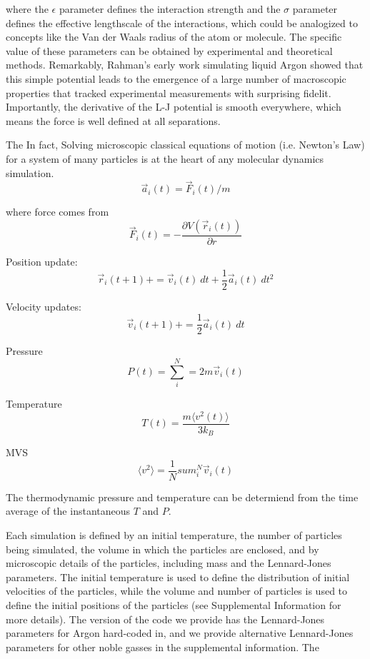\documentclass[journal=jpclcd,manuscript=article]{achemso}
\begin{document}
where the $\epsilon$ parameter defines the interaction strength and the $\sigma$ parameter defines the effective
lengthscale of the interactions, which could be analogized to concepts like the Van der Waals radius of the atom or molecule.
The specific value of these parameters can be obtained by experimental and theoretical methods.  Remarkably, Rahman's early
work simulating liquid Argon showed that this simple potential leads to the emergence of a large number of macroscopic properties 
that tracked experimental measurements with surprising fidelit. %
Importantly, the derivative of the L-J potential is smooth everywhere, which means the force is well defined
at all separations.  

The 
In fact, 
Solving microscopic classical equations of motion (i.e. Newton's Law) 
for a system of many particles is at the heart of 
any molecular dynamics simulation.   
\begin{equation}
\vec{a}_i(t) = \vec{F}_i(t) / m
\end{equation}

where force comes from
\begin{equation}
\vec{F}_i(t) = -\frac{ \partial V( \vec{r}_i(t) ) }{ \partial r}
\end{equation}

Position update:
\begin{equation}
\vec{r}_{i}(t+1) += \vec{v}_i(t) \: dt + \frac{1}{2} \vec{a}_i(t) \: dt^2 
\end{equation}

Velocity updates:
\begin{equation}
\vec{v}_i (t+1) += \frac{1}{2} \vec{a}_i(t) \: dt
\end{equation}

Pressure
\begin{equation}
P(t) = \sum_i^N = 2 m \vec{v}_i(t)
\end{equation}

Temperature
\begin{equation}
T(t) = \frac{ m \langle v^2 (t) \rangle }{3 k_B}
\end{equation}

MVS
\begin{equation}
\langle v^2 \rangle = \frac{1}{N} sum_i^N \vec{v}_i(t)
\end{equation}

The thermodynamic pressure and temperature can be determiend from the time average of
the instantaneous $T$ and $P$.  

Each simulation is defined
by an initial temperature, the number of particles being simulated, the volume in which the particles are enclosed,
and by microscopic details of the particles, including mass and the Lennard-Jones parameters.  The initial temperature
is used to define the distribution of initial velocities of the particles, while the volume and number of particles is used
to define the initial positions of the particles (see Supplemental Information for more details).  The version of the code
we provide has the Lennard-Jones parameters for Argon%
hard-coded in, and we provide alternative Lennard-Jones parameters for other noble gasses in the supplemental information.
The
\end{document}
